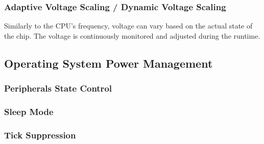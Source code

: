 \subsubsection{Adaptive Voltage Scaling / Dynamic Voltage Scaling}
Similarly to the CPU's frequency, voltage can vary based on the actual state of the chip.
The voltage is continuously monitored and adjusted during the runtime.


\subsection{Operating System Power Management}

\subsubsection{Peripherals State Control}

\subsubsection{Sleep Mode}

\subsubsection{Tick Suppression}